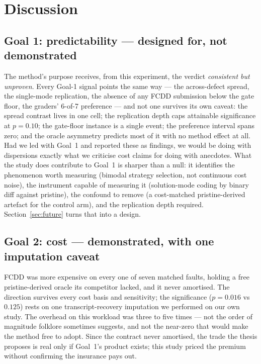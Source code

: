 \documentclass[runningheads]{llncs}
\begin{document}
\section{Discussion}

\subsection{Goal 1: predictability --- designed for, not demonstrated}
The method's purpose receives, from this experiment, the verdict
\emph{consistent but unproven}. Every Goal-1 signal points the same way ---
the across-defect spread, the single-mode replication, the absence of any
FCDD submission below the gate floor, the graders' 6-of-7 preference --- and
not one survives its own caveat: the spread contrast lives in one cell; the
replication depth caps attainable significance at $p=0.10$; the gate-floor
instance is a single event; the preference interval spans zero; and the
oracle asymmetry predicts most of it with no method effect at all. Had we led
with Goal~1 and reported these as findings, we would be doing with
dispersions exactly what we criticise cost claims for doing with anecdotes.
What the study does contribute to Goal~1 is sharper than a null: it
identifies the phenomenon worth measuring (bimodal strategy selection, not
continuous cost noise), the instrument capable of measuring it
(solution-mode coding by binary diff against pristine), the confound to
remove (a cost-matched pristine-derived artefact for the control arm), and
the replication depth required. Section~\ref{sec:future} turns that into a
design.

\subsection{Goal 2: cost --- demonstrated, with one imputation caveat}
FCDD was more expensive on every one of seven matched faults, holding a free
pristine-derived oracle its competitor lacked, and it never amortised. The
direction survives every cost basis and sensitivity; the significance
($p=0.016$ vs $0.125$) rests on one transcript-recovery imputation we
performed on our own study. The overhead on this workload was three to five
times --- not the order of magnitude folklore sometimes suggests, and not the
near-zero that would make the method free to adopt. Since the contract never
amortised, the trade the thesis proposes is real only if Goal~1's product
exists; this study priced the premium without confirming the insurance pays
out.
\end{document}
